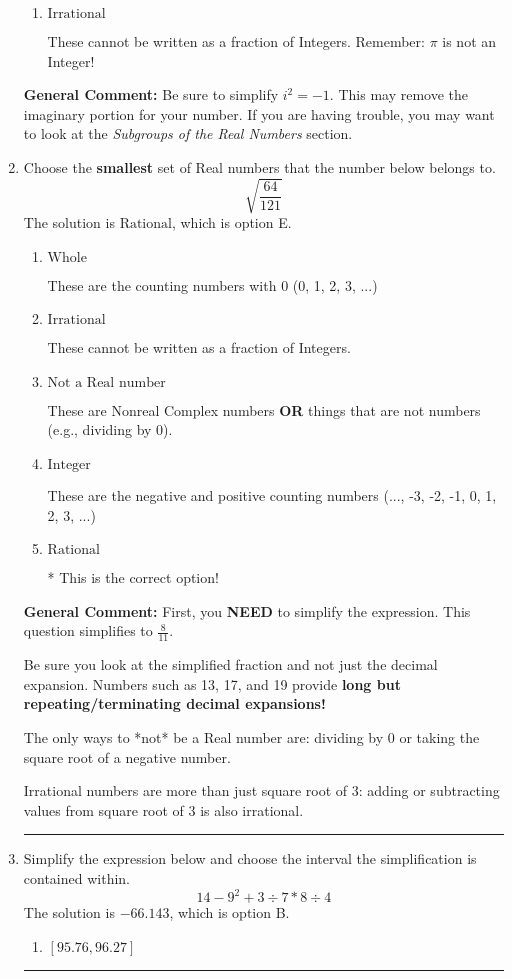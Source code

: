 \documentclass{extbook}[14pt]
\newcommand{\litem}[1]{\item #1

\rule{\textwidth}{0.4pt}}
\begin{document}
\begin{enumerate}
{\begin{enumerate}[label=\Alph*.]
This is a Complex number $(a+bi)$ that is not Real (has $i$ as part of the number).
\item \( \text{Irrational} \)

These cannot be written as a fraction of Integers. Remember: $\pi$ is not an Integer!
\end{enumerate}

\textbf{General Comment:} Be sure to simplify $i^2 = -1$. This may remove the imaginary portion for your number. If you are having trouble, you may want to look at the \textit{Subgroups of the Real Numbers} section.
}
\litem{
Choose the \textbf{smallest} set of Real numbers that the number below belongs to.
\[ \sqrt{\frac{64}{121}} \]The solution is \( \text{Rational} \), which is option E.\begin{enumerate}[label=\Alph*.]
\item \( \text{Whole} \)

These are the counting numbers with 0 (0, 1, 2, 3, ...)
\item \( \text{Irrational} \)

These cannot be written as a fraction of Integers.
\item \( \text{Not a Real number} \)

These are Nonreal Complex numbers \textbf{OR} things that are not numbers (e.g., dividing by 0).
\item \( \text{Integer} \)

These are the negative and positive counting numbers (..., -3, -2, -1, 0, 1, 2, 3, ...)
\item \( \text{Rational} \)

* This is the correct option!
\end{enumerate}

\textbf{General Comment:} First, you \textbf{NEED} to simplify the expression. This question simplifies to $\frac{8}{11}$. 
 
 Be sure you look at the simplified fraction and not just the decimal expansion. Numbers such as 13, 17, and 19 provide \textbf{long but repeating/terminating decimal expansions!} 
 
 The only ways to *not* be a Real number are: dividing by 0 or taking the square root of a negative number. 
 
 Irrational numbers are more than just square root of 3: adding or subtracting values from square root of 3 is also irrational.
}
\litem{
Simplify the expression below and choose the interval the simplification is contained within.
\[ 14 - 9^2 + 3 \div 7 * 8 \div 4 \]The solution is \( -66.143 \), which is option B.\begin{enumerate}[label=\Alph*.]
\item \( [95.76, 96.27] \)


\end{enumerate}}
\end{enumerate}
\end{document}
